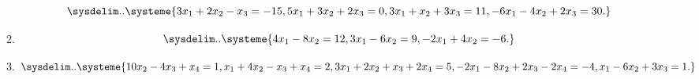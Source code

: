 \documentclass[english,12pt,a4paper]{scrartcl}
\begin{document}
\begin{enumerate}
\begin{multicols}{2}[\setlength{\columnseprule}{0pt}]
\begin{enumerate}
          \[
            \sysdelim..\systeme{
              3x_1 + 2x_2 - x_3 = -15,
              5x_1 + 3x_2 + 2x_3 = 0,
              3x_1 + x_2 + 3x_3 = 11,
              -6x_1 - 4x_2 + 2x_3 = 30.
            }
          \]
        \item
          \[
            \sysdelim..\systeme{
              4x_1 - 8x_2 = 12,
              3x_1 - 6x_2 = 9,
              -2x_1 + 4x_2 = -6.
            }
          \]
        \item
          \[
            \sysdelim..\systeme{
              10x_2 - 4x_3 + x_4 = 1,
              x_1 + 4x_2 - x_3 + x_4 = 2,
              3x_1 + 2x_2 + x_3 + 2x_4 = 5,
              -2x_1 - 8x_2 + 2x_3 -2x_4 = -4,
              x_1 - 6x_2 + 3x_3 = 1.
            }
          \]
      \end{enumerate}
    \end{multicols}
\end{enumerate}
\end{document}
